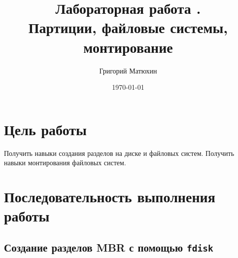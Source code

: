 \documentclass[12pt]{article}
\author{Григорий Матюхин}
\date{\today}
\title{Лабораторная работа \textnumero14.\\Партиции, файловые системы, монтирование}
\begin{document}
\maketitle
\newpage
\tableofcontents
\newpage
\section{Цель работы}
Получить навыки создания разделов на диске и файловых систем. Получить навыки монтирования файловых систем.

\section{Последовательность выполнения работы}
\subsection{Создание разделов MBR с помощью \texttt{fdisk}}
\end{document}
